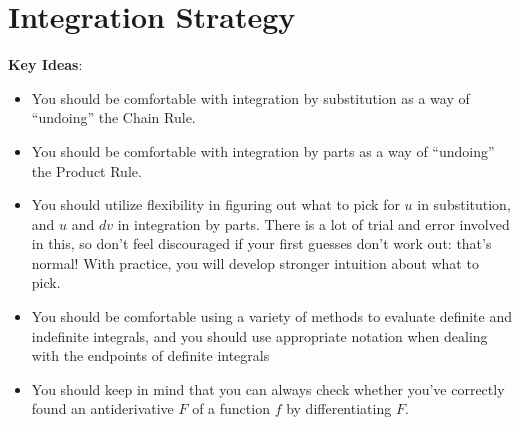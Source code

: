 \documentclass[main]{subfiles}
\begin{document}
\ifSubfilesClassLoaded{%
  \chaptermark{\chaptersix}
}{}

\section{Integration Strategy} \label{ws6-4}

\begin{problemonly}
    \begin{framed}

\textbf{Key Ideas}:

\begin{itemize}[topsep=0pt,partopsep=0pt,parsep=8pt,itemsep=0pt]


\item You should be comfortable with integration by substitution as a
  way of ``undoing'' the Chain Rule.
  
  \item You should be comfortable with integration by parts as a
  way of ``undoing'' the Product Rule.

\item You should utilize flexibility in figuring out what to
  pick for $u$ in substitution, and $u$ and $dv$ in integration by parts.  There is a lot of trial and error involved in this, so don't feel discouraged if your first guesses don't work out: that's
  normal!  With practice, you will develop stronger intuition about what
  to pick.

\item You should be comfortable using a variety of methods to evaluate definite and indefinite integrals, and you should use appropriate notation when dealing with the endpoints of definite integrals

  \item You should keep in mind that you can always check whether you've correctly found an antiderivative $F$ of a function $f$ by differentiating $F$.


\end{itemize}
\end{framed}
\end{problemonly}

\end{document}
